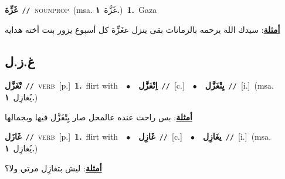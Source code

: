 \documentclass[10pt,a4paper,twoside]{article} %
\begin{document}
\begin{multicols}{2}
{\setlength\topsep{0pt}\textbf{\foreignlanguage{arabic}{غَزِّة}}\ {\color{gray}\texttt{//}\color{black}}\ \textsc{noun\textunderscore prop}\ \color{gray}(msa. \foreignlanguage{arabic}{غَزَّة}~\foreignlanguage{arabic}{\textbf{١.}})\color{black}\ \textbf{1.}~Gaza\  \begin{flushright}\color{gray}\foreignlanguage{arabic}{\textbf{\underline{\foreignlanguage{arabic}{أمثلة}}}: سيدك الله يرحمه بالزمانات بقى ينزل عغَزِّة كل أسبوع يزور بنت أخته هداية}\end{flushright}\color{black}} \vspace{2mm}

\vspace{-3mm}
\subsection*{\color{blue}\foreignlanguage{arabic}{غ.ز.ل}\color{blue}{}} 

{\setlength\topsep{0pt}\textbf{\foreignlanguage{arabic}{تْغَزَّل}}\ {\color{gray}\texttt{//}\color{black}}\ \textsc{verb}\ [p.]\ \textbf{1.}~flirt with\ \ $\bullet$\ \ \setlength\topsep{0pt}\textbf{\foreignlanguage{arabic}{اِتْغَزَّل}}\ {\color{gray}\texttt{//}\color{black}}\ [c.]\ \ $\bullet$\ \ \setlength\topsep{0pt}\textbf{\foreignlanguage{arabic}{يِتْغَزَّل}}\ {\color{gray}\texttt{//}\color{black}}\ [i.]\ \color{gray}(msa. \foreignlanguage{arabic}{يُغازِل}~\foreignlanguage{arabic}{\textbf{١.}})\color{black}\  \begin{flushright}\color{gray}\foreignlanguage{arabic}{\textbf{\underline{\foreignlanguage{arabic}{أمثلة}}}: بس راحت عنده عالمحل صار يِتْغَزَّل فيها وبجمالها}\end{flushright}\color{black}} \vspace{2mm}

{\setlength\topsep{0pt}\textbf{\foreignlanguage{arabic}{غَازَل}}\ {\color{gray}\texttt{//}\color{black}}\ \textsc{verb}\ [p.]\ \textbf{1.}~flirt with\ \ $\bullet$\ \ \setlength\topsep{0pt}\textbf{\foreignlanguage{arabic}{غَازِل}}\ {\color{gray}\texttt{//}\color{black}}\ [c.]\ \ $\bullet$\ \ \setlength\topsep{0pt}\textbf{\foreignlanguage{arabic}{يغَازِل}}\ {\color{gray}\texttt{//}\color{black}}\ [i.]\ \color{gray}(msa. \foreignlanguage{arabic}{يُغازِل}~\foreignlanguage{arabic}{\textbf{١.}})\color{black}\  \begin{flushright}\color{gray}\foreignlanguage{arabic}{\textbf{\underline{\foreignlanguage{arabic}{أمثلة}}}: ليش بتغازِل مرتي ولا؟}\end{flushright}\color{black}} \vspace{2mm}


\end{multicols}
\end{document}
